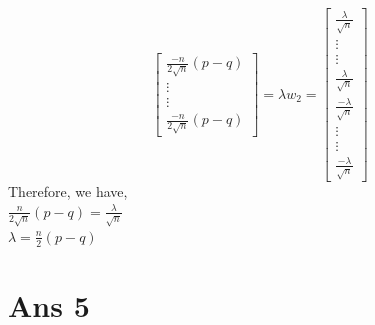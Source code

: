 \documentclass[10pt]{article}
\begin{document}
\begin{flushleft}
$$\begin{bmatrix}
\frac{-n}{2 \sqrt n} (p-q)\\
\vdots\\
\vdots\\
\frac{-n}{2 \sqrt n} (p-q)
\end{bmatrix}
= \lambda w_{2}
= \begin{bmatrix}
\frac{\lambda}{\sqrt n}\\
\vdots\\
\vdots\\
\frac{\lambda}{\sqrt n}\\
\frac{-\lambda}{\sqrt n}\\
\vdots\\
\vdots\\
\frac{-\lambda}{\sqrt n}
\end{bmatrix}
$$
Therefore, we have,\\
\vspace{0.5em}
$\frac{n}{2 \sqrt n} (p-q) = \frac{\lambda}{\sqrt n}$\\
\vspace{0.5em}
$\lambda = \frac{n}{2} (p-q)$
\end{flushleft}
\section*{Ans 5}
\begin{figure}[!htb]
    \begin{floatrow}
    \end{floatrow}
\end{figure}
\end{document}
